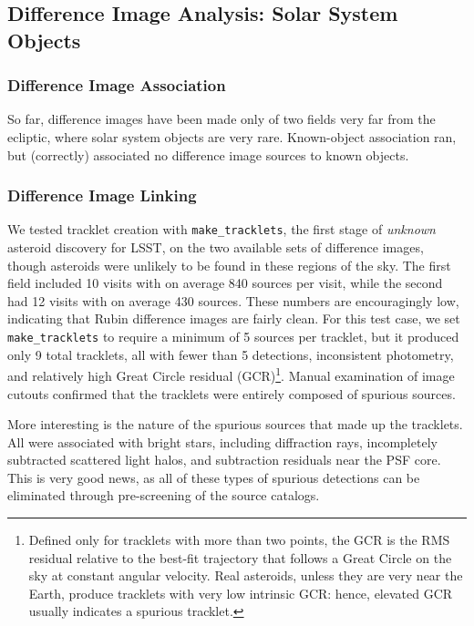 \subsection{Difference Image Analysis: Solar System Objects}
\label{sec:dia_solar_system}

\subsubsection{Difference Image Association}
\label{sec:dia_solar_system_assoc}

So far, difference images have been made only of two fields very far from the ecliptic, where solar system objects are very rare. Known-object association ran, but (correctly) associated no difference image sources to known objects. 

\subsubsection{Difference Image Linking}
\label{sec:dia_solar_system_link}

We tested tracklet creation with {\tt make\_tracklets}, the first stage of {\em unknown} asteroid discovery for LSST, on the two available sets of difference images, though asteroids were unlikely to be found in these regions of the sky. The first field included 10 visits with on average 840 sources per visit, while the second had 12 visits with on average 430 sources. These numbers are encouragingly low, indicating that Rubin difference images are fairly clean. For this test case, we set {\tt make\_tracklets} to require a minimum of 5 sources per tracklet, but it produced only 9 total tracklets, all with fewer than 5 detections, inconsistent photometry, and relatively high Great Circle residual (GCR)\footnote{Defined only for tracklets with more than two points, the GCR is the RMS residual relative to the best-fit trajectory that follows a Great Circle on the sky at constant angular velocity. Real asteroids, unless they are very near the Earth, produce tracklets with very low intrinsic GCR: hence, elevated GCR usually indicates a spurious tracklet.}. Manual examination of image cutouts confirmed that the tracklets were entirely composed of spurious sources.

More interesting is the nature of the spurious sources that made up the tracklets. All were associated with bright stars, including diffraction rays, incompletely subtracted scattered light halos, and subtraction residuals near the PSF core. This is very good news, as all of these types of spurious detections can be eliminated through pre-screening of the source catalogs. 

